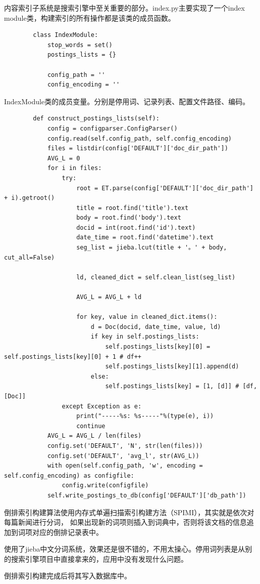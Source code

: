 \documentclass[12pt]{article}
\begin{document}
		内容索引子系统是搜索引擎中至关重要的部分。index.py主要实现了一个index module类，构建索引的所有操作都是该类的成员函数。
		
		\begin{lstlisting}
		class IndexModule:
			stop_words = set()
			postings_lists = {}
			
			config_path = ''
			config_encoding = ''
		\end{lstlisting}
		
		IndexModule类的成员变量。分别是停用词、记录列表、配置文件路径、编码。
		
		\begin{lstlisting}
		def construct_postings_lists(self):
			config = configparser.ConfigParser()
			config.read(self.config_path, self.config_encoding)
			files = listdir(config['DEFAULT']['doc_dir_path'])
			AVG_L = 0
			for i in files:
				try:
					root = ET.parse(config['DEFAULT']['doc_dir_path'] + i).getroot()
					title = root.find('title').text
					body = root.find('body').text
					docid = int(root.find('id').text)
					date_time = root.find('datetime').text
					seg_list = jieba.lcut(title + '。' + body, cut_all=False)
					
					ld, cleaned_dict = self.clean_list(seg_list)
					
					AVG_L = AVG_L + ld
					
					for key, value in cleaned_dict.items():
						d = Doc(docid, date_time, value, ld)
						if key in self.postings_lists:
							self.postings_lists[key][0] = self.postings_lists[key][0] + 1 # df++
							self.postings_lists[key][1].append(d)
						else:
							self.postings_lists[key] = [1, [d]] # [df, [Doc]]
				except Exception as e:
					print("-----%s: %s-----"%(type(e), i))
					continue
			AVG_L = AVG_L / len(files)
			config.set('DEFAULT', 'N', str(len(files)))
			config.set('DEFAULT', 'avg_l', str(AVG_L))
			with open(self.config_path, 'w', encoding = self.config_encoding) as configfile:
				config.write(configfile)
			self.write_postings_to_db(config['DEFAULT']['db_path'])
		\end{lstlisting}
		
		倒排索引构建算法使用内存式单遍扫描索引构建方法（SPIMI），其实就是依次对每篇新闻进行分词，
		如果出现新的词项则插入到词典中，否则将该文档的信息追加到词项对应的倒排记录表中。
		
		使用了jieba中文分词系统，效果还是很不错的，不用太操心。停用词列表是从别的搜索引擎项目中直接拿来的，应用中没有发现什么问题。
		
		倒排索引构建完成后将其写入数据库中。	
		
\end{document}
